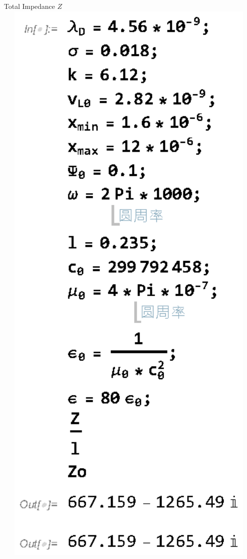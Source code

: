 \documentclass[11pt]{beamer}
\begin{document}
\begin{frame}{Total Impedance $Z$}
    \includegraphics[width=1\textwidth]{2.eps}
\end{frame}
\end{document}
